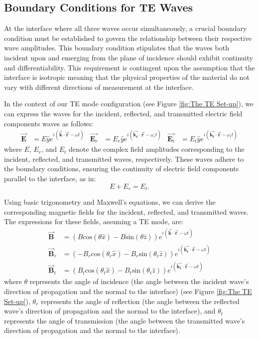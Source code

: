 
\subsection{Boundary Conditions for TE Waves}
At the interface where all three waves occur simultaneously, a crucial boundary condition must be established to govern the relationship between their respective wave amplitudes. This boundary condition stipulates that the waves both incident upon and emerging from the plane of incidence should exhibit continuity and differentiability. This requirement is contingent upon the assumption that the interface is isotropic meaning that the physical properties of the material do not vary with different directions of measurement at the interface.

In the context of our TE mode configuration (see Figure \ref{fig:The TE Set-up}), we can express the waves for the incident, reflected, and transmitted electric field components waves as follows:
    \begin{align*}
    \vec{\mathbf{E}} &= E \hat{y} e^{i(\vec{\mathbf{k}} \cdot \vec{\mathbf{r}} - \omega t)}           &  \vec{\mathbf{E}_r} &= E_r \hat{y} e^{i(\vec{\mathbf{k_r}} \cdot \vec{\mathbf{r}} - \omega_r t)}               &  \vec{\mathbf{E}_t} &= E_t \hat{y} e^{i(\vec{\mathbf{k_t}} \cdot \vec{\mathbf{r}} - \omega_t t)}
    \end{align*}
where $E$, $E_r$, and $E_t$ denote the complex field amplitudes corresponding to the incident, reflected, and transmitted waves, respectively. These waves adhere to the boundary conditions, ensuring the continuity of electric field components parallel to the interface, as in:
\begin{equation} \label{Electric field boundary conditions for TE waves}
E + E_r = E_t.
\end{equation}

Using basic trigonometry and Maxwell's equations, we can derive the corresponding magnetic fields for the incident, reflected, and transmitted waves. The expressions for these fields, assuming a TE mode, are:
\begin{align*} 
\vec{\mathbf{B}} &= (B\mathrm{cos}(\theta \hat{x}) - B\mathrm{sin}(\theta \hat{z})) e^{i(\vec{\mathbf{k}} \cdot \vec{\mathbf{r}} - \omega t)} \\
\vec{\mathbf{B}}_r &= (-B_r\mathrm{cos}(\theta_r \hat{x}) - B_r\mathrm{sin}(\theta_r \hat{z})) e^{i(\vec{\mathbf{k_r}} \cdot \vec{\mathbf{r}} - \omega t)} \\ 
\vec{\mathbf{B}}_t &= (B_t\mathrm{cos}(\theta_t \hat{x}) - B_t\mathrm{sin}(\theta_t \hat{z})) e^{i(\vec{\mathbf{k_t}} \cdot \vec{\mathbf{r}} - \omega t)}
\end{align*} where $\theta$ represents the angle of incidence (the angle between the incident wave's direction of propagation and the normal to the interface) (see Figure \ref{fig:The TE Set-up}), $\theta_r$ represents the angle of reflection (the angle between the reflected wave's direction of propagation and the normal to the interface), and $\theta_t$ represents the angle of transmission (the angle between the transmitted wave's direction of propagation and the normal to the interface).

